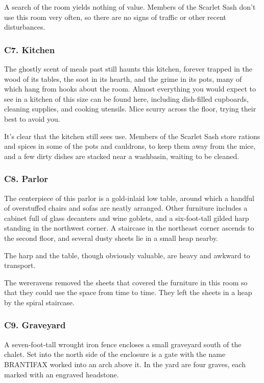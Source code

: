 \documentclass[10pt,a4paper,twoside,bg=print,twocolumn,openany,nodeprecatedcode]{dndbook}
\begin{document}
A search of the room yields nothing of value. Members of the Scarlet Sash don't use this room very often, so there are no signs of traffic or other recent disturbances.

\subsubsection{C7. Kitchen}
\begin{DndReadAloud}{}
The ghostly scent of meals past still haunts this kitchen, forever trapped in the wood of its tables, the soot in its hearth, and the grime in its pots, many of which hang from hooks about the room. Almost everything you would expect to see in a kitchen of this size can be found here, including dish-filled cupboards, cleaning supplies, and cooking utensils. Mice scurry across the floor, trying their best to avoid you. 

\end{DndReadAloud}

It's clear that the kitchen still sees use. Members of the Scarlet Sash store rations and spices in some of the pots and cauldrons, to keep them away from the mice, and a few dirty dishes are stacked near a washbasin, waiting to be cleaned.

\subsubsection{C8. Parlor}
\begin{DndReadAloud}{}
The centerpiece of this parlor is a gold-inlaid low table, around which a handful of overstuffed chairs and sofas are neatly arranged. Other furniture includes a cabinet full of glass decanters and wine goblets, and a six-foot-tall gilded harp standing in the northwest corner. A staircase in the northeast corner ascends to the second floor, and several dusty sheets lie in a small heap nearby. 

\end{DndReadAloud}

The harp and the table, though obviously valuable, are heavy and awkward to transport.

The wereravens removed the sheets that covered the furniture in this room so that they could use the space from time to time. They left the sheets in a heap by the spiral staircase.

\subsubsection{C9. Graveyard}
\begin{DndReadAloud}{}
A seven-foot-tall wrought iron fence encloses a small graveyard south of the chalet. Set into the north side of the enclosure is a gate with the name BRANTIFAX worked into an arch above it. In the yard are four graves, each marked with an engraved headstone. 

\end{DndReadAloud}
\end{document}
